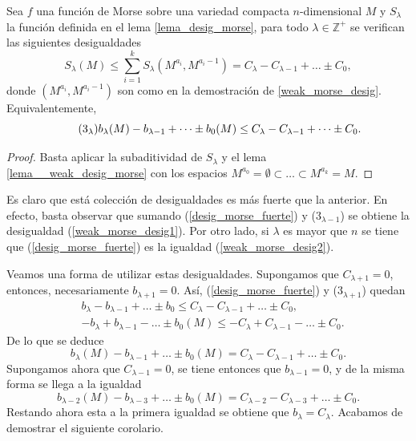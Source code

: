\begin{theorem}
    Sea $f$ una función de Morse sobre una variedad compacta $n$-dimensional $M$ y $S_{\lambda}$ la función definida en el lema \ref{lema_desig_morse}, para todo $\lambda\in \mathbb{Z}^+$ se verifican las siguientes desigualdades
    \begin{equation*}
        S_{\lambda}(M)\le \sum_{i=1}^k S_{\lambda}(M^{a_i},M^{a_i-1}) = C_{\lambda}-C_{\lambda-1}+\dots\pm C_0,
    \end{equation*}
    donde $(M^{a_i},M^{a_i-1})$ son como en la demostración de \ref{weak_morse_desig}. Equivalentemente,
    \begin{equation}
    \label{desig_morse_fuerte}
    \tag{$3_{\lambda}$}
        b_{\lambda}(M)-b_{\lambda-1}+\dots\pm b_0(M) \le C_{\lambda}-C_{\lambda-1}+\dots\pm C_0.
    \end{equation}
\end{theorem}
\begin{proof}
    Basta aplicar la subaditividad de $S_{\lambda}$ y el lema \ref{lema__weak_desig_morse} con los espacios $M^{a_0}=\emptyset \subset \dots \subset M^{a_k}=M$.

\end{proof}

Es claro que está colección de desigualdades es más fuerte que la anterior. En efecto, basta observar que sumando (\ref{desig_morse_fuerte}) y ($3_{\lambda-1}$) se obtiene la desigualdad (\ref{weak_morse_desig1}). Por otro lado, si $\lambda$ es mayor que $n$ se tiene que (\ref{desig_morse_fuerte}) es la igualdad (\ref{weak_morse_desig2}).

\bigskip
Veamos una forma de utilizar estas desigualdades. Supongamos que $C_{\lambda+1}=0$, entonces, necesariamente $b_{\lambda+1}=0$. Así, (\ref{desig_morse_fuerte}) y ($3_{\lambda+1}$) quedan
\begin{align*}
    &b_{\lambda}-b_{\lambda-1}+\dots\pm b_0 \le C_{\lambda}-C_{\lambda-1}+\dots\pm C_0,\\
    &-b_{\lambda}+b_{\lambda-1}-\dots\pm b_0(M) \le -C_{\lambda}+C_{\lambda-1}-\dots\pm C_0.
\end{align*}
De lo que se deduce
\begin{equation*}
    b_{\lambda}(M)-b_{\lambda-1}+\dots\pm b_0(M) = C_{\lambda}-C_{\lambda-1}+\dots\pm C_0.
\end{equation*}
Supongamos ahora que $C_{\lambda-1}=0$, se tiene entonces que $b_{\lambda-1}=0$, y de la misma forma se llega a la igualdad
\begin{equation*}
    b_{\lambda-2}(M)-b_{\lambda-3}+\dots\pm b_0(M) = C_{\lambda-2}-C_{\lambda-3}+\dots\pm C_0.
\end{equation*}
Restando ahora esta a la primera igualdad se obtiene que $b_{\lambda} = C_{\lambda}$. Acabamos de demostrar el siguiente corolario.

